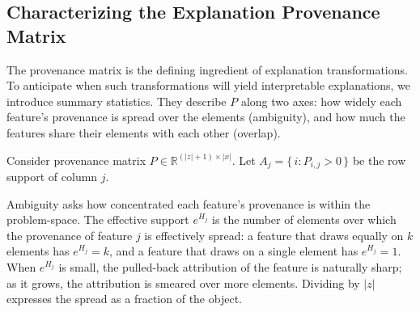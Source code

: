 
\subsection{Characterizing the Explanation Provenance Matrix}
\label{sec:CharacterizingExplanationProvenanceMatrix}

The provenance matrix is the defining ingredient of explanation transformations. To anticipate when such transformations will yield interpretable explanations, we introduce summary statistics. They describe $P$ along two axes: how widely each feature's provenance is spread over the elements (ambiguity), and how much the features share their elements with each other (overlap).

\begin{notationbox}
Consider provenance matrix $P \in \mathbb{R}^{(|z| + 1) \times |x|}$. Let $A_j=\{\,i: P_{i,j}>0\,\}$ be the row support of column $j$.
\end{notationbox}


Ambiguity asks how concentrated each feature's provenance is within the problem-space. The effective support $e^{H_j}$ is the number of elements over which the provenance of feature $j$ is effectively spread: a feature that draws equally on $k$ elements has $e^{H_j} = k$, and a feature that draws on a single element has $e^{H_j} = 1$. When $e^{H_j}$ is small, the pulled-back attribution of the feature is naturally sharp; as it grows, the attribution is smeared over more elements. Dividing by $|z|$ expresses the spread as a fraction of the object.

